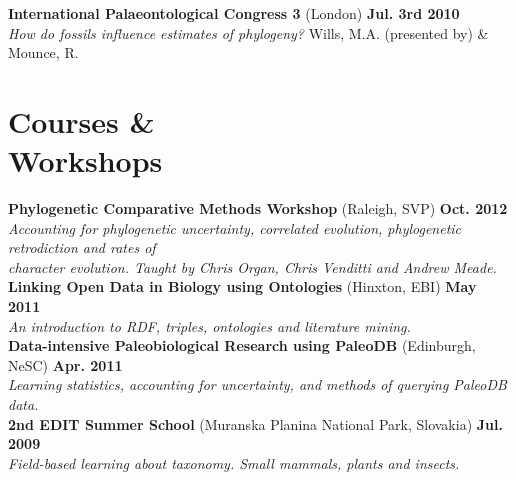 \documentclass[margin,line]{resume}
\begin{document}
\begin{resume}
\vspace{-7 mm} 
\textbf{International Palaeontological Congress 3} (London)
 \hfill \textbf{Jul. 3rd 2010}\\
    \textsl{How do fossils influence estimates of phylogeny?} Wills, M.A. (presented by) \& Mounce, R. \\

\vspace{-7 mm}

    \section{\mysidestyle Courses \& \\ Workshops} 
\textbf{Phylogenetic Comparative Methods Workshop} (Raleigh, SVP) \hfill \textbf{Oct. 2012}\\
    \textsl{Accounting for phylogenetic uncertainty, correlated evolution, phylogenetic retrodiction and rates of \\ character evolution. Taught by Chris Organ, Chris Venditti and Andrew Meade.}\\

\vspace{-7 mm} 
\textbf{Linking Open Data in Biology using Ontologies} (Hinxton, EBI)
 \hfill \textbf{May 2011}\\
    \textsl{An introduction to RDF, triples, ontologies and literature mining.}\\

\vspace{-7 mm} 
\textbf{Data-intensive Paleobiological Research using PaleoDB} (Edinburgh, NeSC)
 \hfill \textbf{Apr. 2011}\\
    \textsl{Learning statistics, accounting for uncertainty, and methods of querying PaleoDB data.}\\

\vspace{-7 mm} 
\textbf{2nd EDIT Summer School} (Muranska Planina National Park, Slovakia)
 \hfill \textbf{Jul. 2009}\\
    \textsl{Field-based learning about taxonomy. Small mammals, plants and insects.}\\

\vspace{-7 mm}  


\end{resume}
\end{document}
